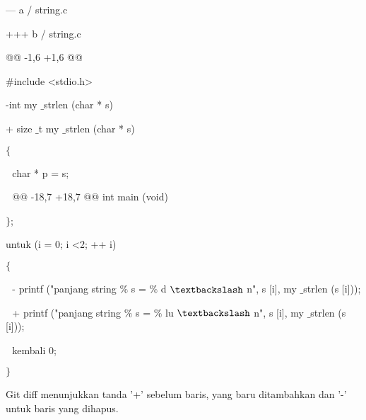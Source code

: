 \noindent 
 \hspace*{0.5in} --- a / string.c \par
\noindent 
 \hspace*{0.5in} +++ b / string.c \par
\noindent 
 \hspace*{0.5in} @@ -1,6 +1,6 @@ \par
\noindent 
 \hspace*{0.5in}  $  \#  $include <stdio.h> \par
\vspace{12pt}
\noindent 
 \hspace*{0.5in} -int my $  \_  $strlen (char * s) \par
\noindent 
 \hspace*{0.5in} + size $  \_  $t my $  \_  $strlen (char * s) \par
\noindent 
 \hspace*{0.5in}  $  \{  $ \par
\noindent 
 \hspace*{0.5in}  $  $ $  $ $  $char * p = s; \par
\noindent 
 \hspace*{0.5in}  $  $ $  $ $  $@@ -18,7 +18,7 @@ int main (void) \par
\noindent 
 \hspace*{0.5in}  $  \}  $; \par
\noindent 
 \hspace*{0.5in} untuk (i = 0; i <2; ++ i) \par
\noindent 
 \hspace*{0.5in}  $  \{  $ \par
\noindent 
 \hspace*{0.5in}  $  $ $  $ $  $- printf ("panjang string $  \%  $ s = $  \%  $ d  $  \textbackslash  $ n", s [i], my $  \_  $strlen (s [i])); \par
\noindent 
 \hspace*{0.5in}  $  $ $  $ $  $+ printf ("panjang string $  \%  $ s = $  \%  $ lu  $  \textbackslash  $ n", s [i], my $  \_  $strlen (s [i])); \par
\noindent 
 \hspace*{0.5in}  $  $ $  $ $  $kembali 0; \par
\noindent 
 \hspace*{0.5in}  $  \}  $ \par
\noindent 
Git diff menunjukkan tanda '+' sebelum baris, yang baru ditambahkan dan '-' untuk baris yang dihapus. \par
